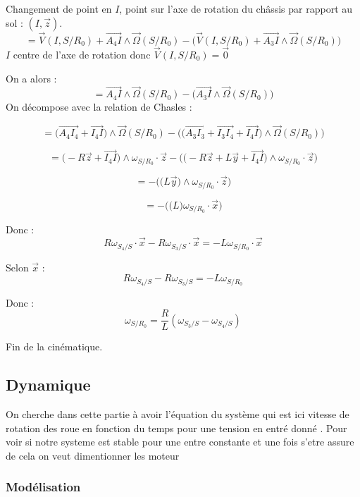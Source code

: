 \documentclass[a4paper,12pt]{report}  %
\begin{document}
Changement de point en $I$, point sur l'axe de rotation du châssis par rapport au sol : $(I,\vec{z})$. 
$$= 
\vec{V}(I, S/R_0) + \overrightarrow{A_4 I} \wedge \vec{\Omega}(S/R_0) 
- \bigg(\vec{V}(I, S/R_0) + \overrightarrow{A_3 I} \wedge \vec{\Omega}(S/R_0) \bigg)
$$
$I$ centre de l'axe de rotation donc $\vec{V}(I, S/R_0) = \vec0$

On a alors : 
$$
= \overrightarrow{A_4 I} \wedge \vec{\Omega}(S/R_0) 
- \bigg( \overrightarrow{A_3 I} \wedge \vec{\Omega}(S/R_0) \bigg)$$
On décompose avec la relation de Chasles : 

$$
= \bigg(\overrightarrow{A_4 I_4}+\overrightarrow{I_4 I} \bigg)
\wedge \vec{\Omega}(S/R_0) 
- \Bigg( 
\bigg(
\overrightarrow{A_3 I_3} 
+ \overrightarrow{I_3 I_4} 
+ \overrightarrow{I_4 I}
\bigg) 
\wedge \vec{\Omega}(S/R_0) 
\Bigg)
$$

$$
= \bigg( -R\vec{z}+\overrightarrow{I_4 I} \bigg)
\wedge {\omega}_{S/R_0} \cdot \vec{z} 
- 
\Bigg( 
\bigg( 
-R\vec{z} + L\vec{y} +\overrightarrow{I_4I}
\bigg) 
\wedge {\omega}_{S/R_0} \cdot \vec{z}  
\Bigg)
$$

$$
= - \Bigg( 
\bigg( 
L\vec{y} 
\bigg) 
\wedge {\omega}_{S/R_0} \cdot \vec{z}  
\Bigg)
$$

$$
= - \Bigg( 
\bigg( 
L
\bigg) 
{\omega}_{S/R_0}
\cdot \vec{x}
\Bigg)
$$

Donc : 
$$
R\omega_{S_4/S} \cdot \vec{x} - R\omega_{S_3/S} \cdot \vec{x}
= -L {\omega}_{S/R_0} \cdot \vec{x}
$$

Selon $\vec{x}$ : 
$$
R\omega_{S_4/S} - R\omega_{S_3/S} 
= -L {\omega}_{S/R_0} 
$$

Donc : 
$$
\boxed{
	{\omega}_{S/R_0}
	= \frac{R}{L} (\omega_{S_3/S} - \omega_{S_4/S} )
}
$$

Fin de la cinématique. 

\subsection{Dynamique} 

On cherche dans cette partie à avoir l'équation du système qui est ici vitesse de rotation des roue en fonction du temps pour une tension en entré donné . Pour voir si notre systeme est stable pour une entre constante et une fois s'etre assure de cela on veut dimentionner les moteur 

\subsubsection{Modélisation} 
\end{document}
